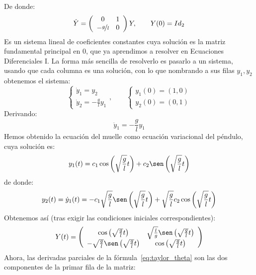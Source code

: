 De donde:
\begin{equation*}
    \dot{Y} = \left(\begin{array}{cc}
        0 & 1 \\
        -\nicefrac{g}{l} & 0 
    \end{array}\right)Y, \qquad Y(0) = Id_2
\end{equation*}
Es un sistema lineal de coeficientes constantes cuya solución es la matriz fundamental principal en $0$, que ya aprendimos a resolver en Ecuaciones Diferenciales I. La forma más sencilla de resolverlo es pasarlo a un sistema, usando que cada columna es una solución, con lo que nombrando a sus filas $y_1,y_2$ obtenemos el sistema:
\begin{equation*}
    \left\{\begin{array}{l}
            \dot{y}_1 = y_2 \\
            \dot{y}_2 = -\frac{g}{l}y_1
    \end{array}\right., \qquad \left\{\begin{array}{l}
        y_1(0) = (1, 0) \\
        y_2(0) = (0, 1) 
    \end{array}\right.
\end{equation*}
Derivando:
\begin{equation*}
    \ddot{y}_1 = -\frac{g}{l}y_1
\end{equation*}
Hemos obtenido la ecuación del muelle como ecuación variacional del péndulo, cuya solución es:
\begin{equation*}
    y_1(t) = c_1\cos\left(\sqrt{\frac{g}{l}}t\right) + c_2\sen\left(\sqrt{\frac{g}{l}}t\right)
\end{equation*}
de donde:
\begin{equation*}
    y_2(t) = \dot{y}_1(t) = -c_1\sqrt{\frac{g}{l}}\sen\left(\sqrt{\frac{g}{l}}t\right) + \sqrt{\frac{g}{l}}c_2\cos\left(\sqrt{\frac{g}{l}}t\right)
\end{equation*}
Obtenemos así (tras exigir las condiciones iniciales correspondientes):
\begin{equation*}
    Y(t) = \left(\begin{array}{cc}
        \cos\left(\sqrt{\frac{g}{l}}t\right) & \sqrt{\frac{l}{g}}\sen\left(\sqrt{\frac{g}{l}}t\right) \\
         -\sqrt{\frac{g}{l}}\sen\left(\sqrt{\frac{g}{l}}t\right) &  \cos\left(\sqrt{\frac{g}{l}}t\right)
    \end{array}\right)
\end{equation*}
Ahora, las derivadas parciales de la fórmula~\eqref{eq:taylor_theta} son las dos componentes de la primar fila de la matriz:
